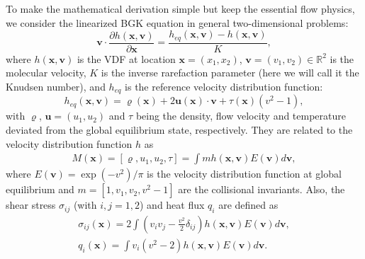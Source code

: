 To make the mathematical derivation simple but keep the essential flow physics, we consider the linearized BGK equation in general two-dimensional problems:
\begin{equation}\label{LBE_BGK}
\bm{v}\cdot\frac{\partial{h}(\bm{x},\bm{v})}{\partial\bm{x}}=\frac{h_{eq}(\bm{x},\bm{v})-h(\bm{x},\bm{v})}{K},
\end{equation}
where $h(\bm{x},\bm{v})$ is the VDF at location $\bm{x}=(x_1,x_2)$, $\bm{v}=(v_1,v_2)\in \mathbb{R}^2$ is the molecular velocity, $K$ is the inverse rarefaction parameter (here we will call it the Knudsen number), and $h_{eq}$ is the reference velocity distribution function:
\begin{equation}\label{LBE_BGK_gain}
h_{eq}(\bm{x},\bm{v})=\varrho(\bm{x})+2\bm{u}(\bm{x})\cdot\bm{v}+\tau(\bm{x})\left(v^2-1\right),
\end{equation}
with $\varrho$, $\bm{u}=(u_1,u_2)$ and $\tau$ being the density, flow velocity and temperature deviated from the global equilibrium state, respectively. They are related to the velocity distribution function $h$ as 
\begin{eqnarray}\label{Macro0}
M(\bm{x})=[\varrho,u_1,u_2,\tau]=\int{m}{h(\bm{x},\bm{v})}E(\bm{v}) d\bm{v},
\end{eqnarray}
where ${E}(\bm{v})=\exp(-v^2)/\pi$ is the velocity distribution function at global equilibrium and $m=[1,v_1, v_2, v^2-1]$ are the collisional invariants. Also, the shear stress $\sigma_{ij}$ (with $i,j=1,2$) and heat flux $q_i$ are defined as
\begin{eqnarray}
\sigma_{ij}(\bm{x})=2\int \left(v_iv_j-\frac{v^2}{2}\delta_{ij}\right)h(\bm{x},\bm{v})E(\bm{v})d\bm{v}, \label{NS_shear_def}\\
q_i(\bm{x})=\int {v_i}\left(v^2-2\right)h(\bm{x},\bm{v})E(\bm{v})d\bm{v}. \label{NS_heat_def}
\end{eqnarray}







